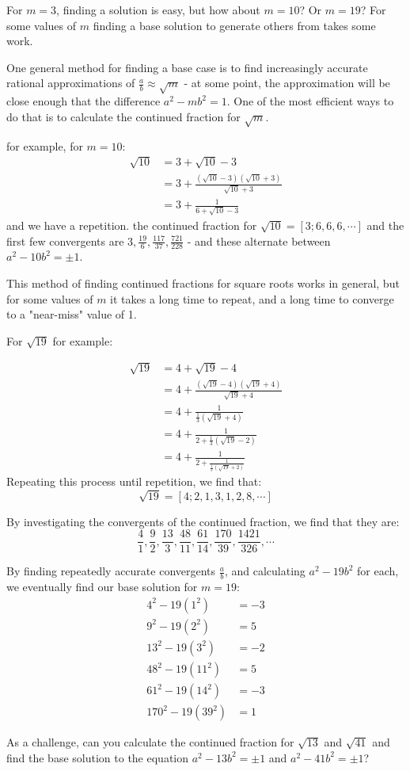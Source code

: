 \documentclass{article}
\begin{document}
For $m=3$, finding a solution is easy, but how about $m=10$? Or $m=19$? For some values of $m$ finding a base solution to generate others from takes some work.

One general method for finding a base case is to find increasingly accurate rational approximations of $\frac{a}{b} \approx \sqrt{m}$ - at some point, the approximation will be close enough that the difference $ a^2-mb^2 = 1$. One of the most efficient ways to do that is to calculate the continued fraction for $\sqrt{m}$.

for example, for $m=10$:
\begin{align*}
    \sqrt{10} &= 3+\sqrt{10}-3 \\
    &= 3+\frac{(\sqrt{10}-3)(\sqrt{10}+3)}{\sqrt{10}+3} \\
    &= 3 + \frac{1}{6+\sqrt{10}-3}
\end{align*}
and we have a repetition. the continued fraction for $\sqrt{10} = [3;6,6,6,\cdots]$ and the first few convergents are $3,\frac{19}{6},\frac{117}{37}, \frac{721}{228}$ - and these alternate between $a^2-10b^2=\pm1$.

This method of finding continued fractions for square roots works in general, but for some values of $m$ it takes a long time to repeat, and a long time to converge to a "near-miss" value of 1.

For $\sqrt{19}$ for example:

\begin{align*}
    \sqrt{19} &= 4 + \sqrt{19} -4 \\
    &= 4 + \frac{(\sqrt{19}-4)(\sqrt{19}+4)}{\sqrt{19}+4} \\
    &= 4 + \frac{1}{\frac{1}{3}(\sqrt{19}+4)} \\
    &= 4 + \frac{1}{2 + \frac{1}{3}(\sqrt{19} - 2) } \\
    &= 4 + \frac{1}{2 + \frac{1}{\frac{1}{5}(\sqrt{19} + 2)}}
\end{align*}
Repeating this process until repetition, we find that:
\[ \sqrt{19} = [4;2,1,3,1,2,8,\cdots] \]

By investigating the convergents of the continued fraction, we find that they are:
\[ \frac{4}{1},\frac{9}{2},\frac{13}{3}, \frac{48}{11}, \frac{61}{14}, \frac{170}{39}, \frac{1421}{326}, \cdots \]

By finding repeatedly accurate convergents $\frac{a}{b}$, and calculating $a^2-19b^2$ for each, 
we eventually find our base solution for $m=19$:
\begin{align*}
	4^2 - 19(1^2) &= -3 \\
	9^2 - 19(2^2) &= 5 \\
	13^2 - 19(3^2) &= -2 \\
	48^2 - 19(11^2) &= 5 \\
	61^2 - 19(14^2) &= -3 \\
	170^2 - 19(39^2) &= 1
\end{align*}

As a challenge, can you calculate the continued fraction for $\sqrt{13}$ and $\sqrt{41}$ and
find the base solution to the equation $a^2-13b^2 = \pm 1$ and $a^2 - 41b^2 = \pm1$?
\end{document}
